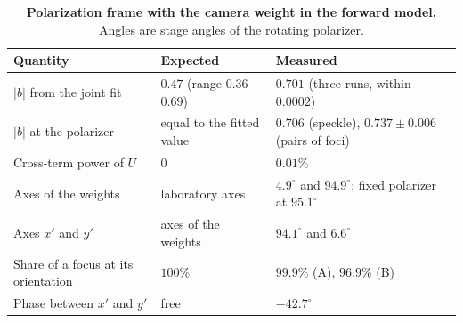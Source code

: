 \documentclass{article}
\begin{document}
\begin{table}[h]
\centering
\caption{\textbf{Polarization frame with the camera weight in the forward model.} Angles are stage angles of the rotating polarizer.}
\label{tab:polframe}
\small
\begin{tabular}{p{}p{}p{}}
\toprule
Quantity & Expected & Measured \\
\midrule
$|b|$ from the joint fit & $0.47$ (range $0.36$--$0.69$) & $0.701$ (three runs, within $0.0002$) \\
$|b|$ at the polarizer & equal to the fitted value & $0.706$ (speckle), $0.737\pm0.006$ (pairs of foci) \\
Cross-term power of $U$ & $0$ & $0.01\%$ \\
Axes of the weights & laboratory axes & $4.9^\circ$ and $94.9^\circ$; fixed polarizer at $95.1^\circ$ \\
Axes $x'$ and $y'$ & axes of the weights & $94.1^\circ$ and $6.6^\circ$ \\
Share of a focus at its orientation & $100\%$ & $99.9\%$ (A), $96.9\%$ (B) \\
Phase between $x'$ and $y'$ & free & $-42.7^\circ$ \\
\bottomrule
\end{tabular}
\end{table}


\clearpage

\end{document}
